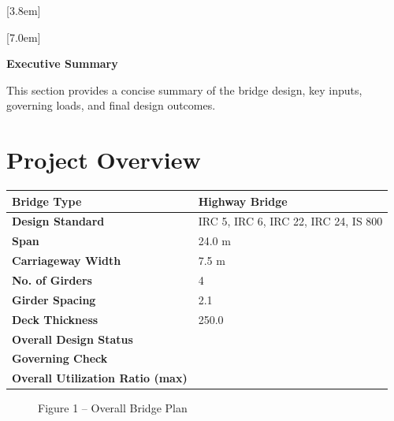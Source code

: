 \documentclass[12pt,a4paper]{report}
\numberwithin{table}{chapter}
\numberwithin{figure}{chapter}
\begin{document}
[3.8em]
  {\normalfont}
  {\contentslabel{2.3em}}
  {\hspace*{-2.3em}}
  {\hfill\contentspage}

[7.0em]
  {\normalfont}
  {\contentslabel{3.2em}}
  {\hspace*{-3.2em}}
  {\hfill\contentspage}

\newpage
\renewcommand{\contentsname}{\centering\Large\bfseries Table of Contents}
\tableofcontents


\newpage
{\centering\Large\bfseries Executive Summary\par}
\vspace{0.8em}

This section provides a concise summary of the bridge design, key inputs, governing loads, and final design outcomes.

\section*{Project Overview}
\label{sec:project-overview}


\begin{tabular}{|L{5.5cm}|L{8.5cm}|}
\hline
\textbf{Bridge Type} & Highway Bridge \\
\hline
\textbf{Design Standard} & IRC 5, IRC 6, IRC 22, IRC 24, IS 800 \\
\hline
\textbf{Span} & 24.0 m \\
\hline
\textbf{Carriageway Width} & 7.5 m \\
\hline
\textbf{No. of Girders} & 4 \\
\hline
\textbf{Girder Spacing} & 2.1 \\
\hline
\textbf{Deck Thickness} & 250.0 \\
\hline
\textbf{Overall Design Status} &  \\
\hline
\textbf{Governing Check} &  \\
\hline
\textbf{Overall Utilization Ratio (max)} &  \\
\hline
\end{tabular}


\begin{figure}[H]
\centering
{}
\caption*{Figure 1 -- Overall Bridge Plan}
\end{figure}

\newpage
\end{document}
